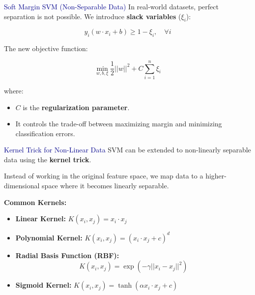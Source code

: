 \begin{frame}{\textcolor{darkblue}{Soft Margin SVM (Non-Separable Data)}}
    In real-world datasets, perfect separation is not possible. We introduce \textbf{slack variables} ($\xi_i$):

    \[
    y_i (w \cdot x_i + b) \geq 1 - \xi_i, \quad \forall i
    \]

    The new objective function:

    \[
    \min_{w,b,\xi} \frac{1}{2} ||w||^2 + C \sum_{i=1}^{n} \xi_i
    \]

    where:
    \begin{itemize}
        \item $C$ is the \textbf{regularization parameter}.
        \item It controls the trade-off between maximizing margin and minimizing classification errors.
    \end{itemize}
\end{frame}

\begin{frame}{\textcolor{darkblue}{Kernel Trick for Non-Linear Data}}
    SVM can be extended to non-linearly separable data using the \textbf{kernel trick}.

    Instead of working in the original feature space, we map data to a higher-dimensional space where it becomes linearly separable.

    \vspace{0.3cm}
    \textbf{Common Kernels:}
    \begin{itemize}
        \item \textbf{Linear Kernel:} \quad $K(x_i, x_j) = x_i \cdot x_j$
        \item \textbf{Polynomial Kernel:} \quad $K(x_i, x_j) = (x_i \cdot x_j + c)^d$
        \item \textbf{Radial Basis Function (RBF):}
        \[
        K(x_i, x_j) = \exp\left(-\gamma ||x_i - x_j||^2\right)
        \]
        \item \textbf{Sigmoid Kernel:} \quad $K(x_i, x_j) = \tanh(\alpha x_i \cdot x_j + c)$
    \end{itemize}

\end{frame}


